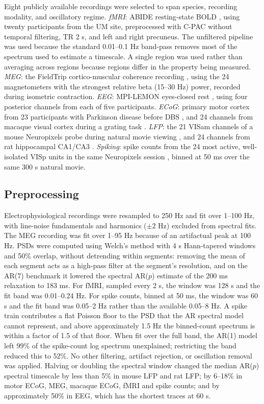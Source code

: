 \documentclass[pdflatex,lineno,sn-nature]{sn-jnl}
\theoremstyle{thmstyleone}
\theoremstyle{thmstyletwo}
\theoremstyle{thmstylethree}
\begin{document}
Eight publicly available recordings were selected to span species, recording modality, and oscillatory regime. \textit{fMRI}: ABIDE resting-state BOLD \cite{di_martino_autism_2014}, using twenty participants from the UM site, preprocessed with C-PAC without temporal filtering, TR 2 s, and left and right precuneus. The unfiltered pipeline was used because the standard 0.01--0.1 Hz band-pass removes most of the spectrum used to estimate a timescale. A single region was used rather than averaging across regions because regions differ in the property being measured. \textit{MEG}: the FieldTrip cortico-muscular coherence recording \cite{schoffelen_neuronal_2005, oostenveld_fieldtrip_2011}, using the 24 magnetometers with the strongest relative beta (15--30 Hz) power, recorded during isometric contraction. \textit{EEG}: MPI-LEMON eyes-closed rest \cite{babayan_mind_2019}, using four posterior channels from each of five participants. \textit{ECoG}: primary motor cortex from 23 participants with Parkinson disease before DBS \cite{cole_nonsinusoidal_2017}, and 24 channels from macaque visual cortex during a grating task \cite{nagasaka_multidimensional_2011}. \textit{LFP}: the 21 VISam channels of a mouse Neuropixels probe during natural movie viewing \cite{siegle_survey_2021}, and 24 channels from rat hippocampal CA1/CA3 \cite{mizuseki_theta_2009, mizuseki_hc3_2013}. \textit{Spiking}: spike counts from the 24 most active, well-isolated VISp units in the same Neuropixels session \cite{siegle_survey_2021}, binned at 50 ms over the same 300 s natural movie.

\subsection{Preprocessing}

Electrophysiological recordings were resampled to 250 Hz and fit over 1--100 Hz, with line-noise fundamentals and harmonics ($\pm 2$ Hz) excluded from spectral fits. The MEG recording was fit over 1--95 Hz because of an artifactual peak at 100 Hz. PSDs were computed using Welch's method with 4 s Hann-tapered windows and 50\% overlap, without detrending within segments: removing the mean of each segment acts as a high-pass filter at the segment's resolution, and on the AR(7) benchmark it lowered the spectral AR($p$) estimate of the 200 ms relaxation to 183 ms. For fMRI, sampled every 2 s, the window was 128 s and the fit band was 0.01--0.24 Hz. For spike counts, binned at 50 ms, the window was 60 s and the fit band was 0.05--2 Hz rather than the available 0.05--8 Hz. A spike train contributes a flat Poisson floor to the PSD that the AR spectral model cannot represent, and above approximately 1.5 Hz the binned-count spectrum is within a factor of 1.5 of that floor. When fit over the full band, the AR(1) model left 99\% of the spike-count log spectrum unexplained; restricting the band reduced this to 52\%. No other filtering, artifact rejection, or oscillation removal was applied. Halving or doubling the spectral window changed the median AR($p$) spectral timescale by less than 5\% in mouse LFP and rat LFP; by 6--18\% in motor ECoG, MEG, macaque ECoG, fMRI and spike counts; and by approximately 50\% in EEG, which has the shortest traces at 60 s.
\end{document}
